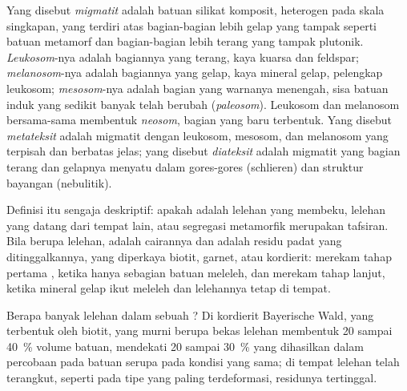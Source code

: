 \begin{definition}\label{def:b2:crustal-melting:migmatite}
Yang disebut \emph{migmatit} adalah batuan silikat komposit, heterogen pada
skala singkapan, yang terdiri atas bagian-bagian lebih gelap yang tampak seperti batuan metamorf dan bagian-bagian lebih terang
yang tampak plutonik. \emph{Leukosom}-nya adalah bagiannya yang terang, kaya kuarsa dan
feldspar; \emph{melanosom}-nya adalah bagiannya yang gelap, kaya mineral
gelap, pelengkap leukosom; \emph{mesosom}-nya adalah bagian yang warnanya
menengah, sisa batuan induk yang sedikit banyak telah berubah (\emph{paleosom}). Leukosom
dan melanosom bersama-sama membentuk \emph{neosom}, bagian yang baru terbentuk. Yang disebut
\emph{metateksit} adalah migmatit dengan leukosom, mesosom, dan melanosom
yang terpisah dan berbatas jelas; yang disebut \emph{diateksit} adalah migmatit yang bagian terang dan
gelapnya menyatu dalam gores-gores (schlieren) dan struktur bayangan (nebulitik).
\end{definition}

Definisi itu sengaja deskriptif: apakah  adalah lelehan yang membeku, lelehan
yang datang dari tempat lain, atau segregasi metamorfik merupakan tafsiran. Bila  berupa
lelehan,  adalah cairannya dan  adalah residu padat yang ditinggalkannya, yang diperkaya
biotit, garnet, atau kordierit:  merekam tahap pertama , ketika
hanya sebagian batuan meleleh, dan  merekam tahap lanjut, ketika mineral gelap
ikut meleleh dan lelehannya tetap di tempat.

Berapa banyak lelehan dalam sebuah ? Di  kordierit Bayerische Wald,
yang terbentuk oleh  biotit,  yang murni berupa bekas lelehan membentuk 20 sampai
\qty{40}{\percent} volume batuan, mendekati 20 sampai \qty{30}{\percent} yang dihasilkan dalam
percobaan  pada batuan serupa pada kondisi yang sama; di tempat lelehan
telah terangkut, seperti pada tipe yang paling terdeformasi, residunya tertinggal.


